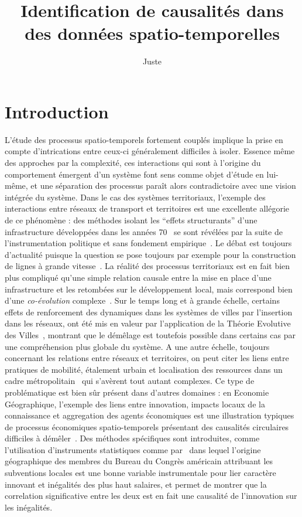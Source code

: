 \documentclass[french]{./sageo}
\title[Causalités Spatio-temporelles]{Identification de causalités dans des données spatio-temporelles}
\author[1,2]{Juste}{Raimbault}
\begin{document}
\maketitle

\newpage



\section{Introduction}



L'étude des processus spatio-temporels fortement couplés implique la prise en compte d'intrications entre ceux-ci généralement difficiles à isoler. Essence même des approches par la complexité, ces interactions qui sont à l'origine du comportement émergent d'un système font sens comme objet d'étude en lui-même, et une séparation des processus paraît alors contradictoire avec une vision intégrée du système. Dans le cas des systèmes territoriaux, l'exemple des interactions entre réseaux de transport et territoires est une excellente allégorie de ce phénomène : des méthodes isolant les ``effets structurants'' d'une infrastructure développées dans les années 70~\cite{bonnafous1974methodologies} se sont révélées par la suite de l'instrumentation politique et sans fondement empirique~\cite{offner1993effets}. Le débat est toujours d'actualité puisque la question se pose toujours par exemple pour la construction de lignes à grande vitesse~\cite{crozethalshs01094554}. La réalité des processus territoriaux est en fait bien plus compliqué qu'une simple relation causale entre la mise en place d'une infrastructure et les retombées sur le développement local, mais correspond bien d'une \emph{co-évolution} complexe~\cite{bretagnolletel00459720}. Sur le temps long et à grande échelle, certains effets de renforcement des dynamiques dans les systèmes de villes par l'insertion dans les réseaux, ont été mis en valeur par l'application de la Théorie Evolutive des Villes~\cite{espacegeo2014effets}, montrant que le démêlage est toutefois possible dans certains cas par une compréhension plus globale du système. A une autre échelle, toujours concernant les relations entre réseaux et territoires, on peut citer les liens entre pratiques de mobilité, étalement urbain et localisation des ressources dans un cadre métropolitain~\cite{cerqueira2017inegalites} qui s'avèrent tout autant complexes. Ce type de problématique est bien sûr présent dans d'autres domaines : en Economie Géographique, l'exemple des liens entre innovation, impacts locaux de la connaissance et aggregation des agents économiques est une illustration typiques de processus économiques spatio-temporels présentant des causalités circulaires difficiles à démêler~\cite{audretsch1996r}. Des méthodes spécifiques sont introduites, comme l'utilisation d'instruments statistiques comme par~\cite{aghion2015innovation} dans lequel l'origine géographique des membres du Bureau du Congrès américain attribuant les subventions locales est une bonne variable instrumentale pour lier caractère innovant et inégalités des plus haut salaires, et permet de montrer que la correlation significative entre les deux est en fait une causalité de l'innovation sur les inégalités.
\end{document}
